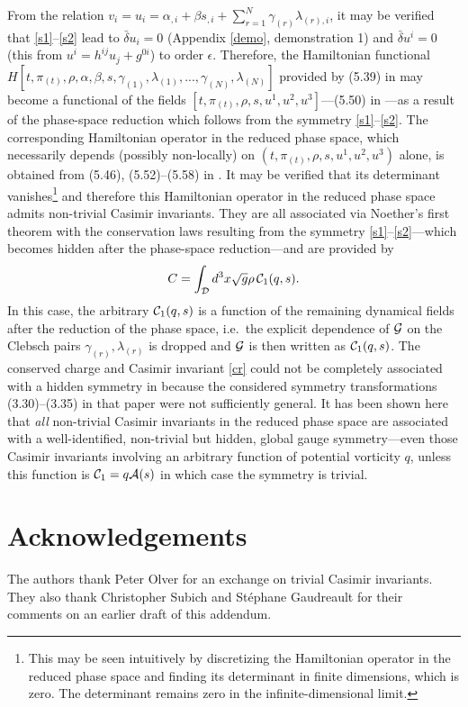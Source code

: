 \documentclass{article}
\numberwithin{equation}{section}
\begin{document}
From the relation $v_i=u_i=\alpha_{,i}+\beta s_{,i} +\sum_{r=1}^N \gamma_{(r)}\lambda_{(r),i}$, it may be verified that \eqref{s1}--\eqref{s2} lead to $\bar\delta u_i=0$ (Appendix \ref{demo}, demonstration 1) and $\bar\delta u^i=0$ (this from $u^i=h^{ij}u_j+g^{0i}$) to order $\epsilon$. Therefore, the Hamiltonian functional $H[t,\pi_{(t)},\rho,\alpha,\beta,s,\gamma_{(1)},\lambda_{(1)},...,\gamma_{(N)},\lambda_{(N)}]$ provided by (5.39) in \citet{Charron18b} may become a functional of the fields $[t,\pi_{(t)},\rho,s,u^1,u^2,u^3]$---(5.50) in \citet{Charron18b}---as a result of the phase-space reduction which follows from the symmetry \eqref{s1}--\eqref{s2}. The corresponding Hamiltonian operator in the reduced phase space, which necessarily depends (possibly non-locally) on $(t,\pi_{(t)},\rho,s,u^1,u^2,u^3)$ alone, is obtained from (5.46), (5.52)--(5.58) in \citet{Charron18b}. It may be verified that its determinant vanishes\footnote[4]{This may be seen intuitively by discretizing the Hamiltonian operator in the reduced phase space and finding its determinant in finite dimensions, which is zero. The determinant remains zero in the infinite-dimensional limit.} and therefore this Hamiltonian operator in the reduced phase space admits non-trivial Casimir invariants. They are all associated via Noether's first theorem with the conservation laws resulting from the symmetry \eqref{s1}--\eqref{s2}---which becomes hidden after the phase-space reduction---and are provided by
\begin{align}
C=\int_{\cal D} d^3x\sqrt{g}\rho\,{\cal C}_1(q,s). \label{cr}
\end{align}
In this case, the arbitrary ${\cal C}_1(q,s)$ is a function of the remaining dynamical fields after the reduction of the phase space, i.e.\ the explicit dependence of $\cal G$ on the Clebsch pairs $\gamma_{(r)},\lambda_{(r)}$ is dropped and $\cal G$ is then written as ${\cal C}_1(q,s)$. The conserved charge and Casimir invariant \eqref{cr} could not be completely associated with a hidden symmetry in \citet{Charron18b} because the considered symmetry transformations (3.30)--(3.35) in that paper were not sufficiently general. It has been shown here that {\it all} non-trivial Casimir invariants in the reduced phase space are associated with a well-identified, non-trivial but hidden, global gauge symmetry---even those Casimir invariants involving an arbitrary function of potential vorticity $q$, unless this function is ${\cal C}_1=q{\cal A}(s)$ in which case the symmetry is trivial.

\section*{Acknowledgements} The authors thank Peter Olver for an exchange on trivial Casimir invariants. They also thank Christopher Subich and St\'ephane Gaudreault for their comments on an earlier draft of this addendum.
\end{document}
